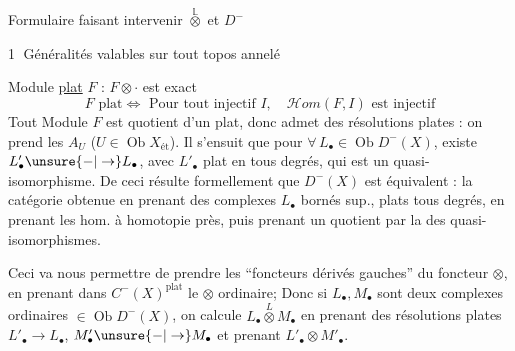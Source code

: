 Formulaire faisant intervenir $\overset{\mathbb L}{\otimes}$ et $D^-$

\textcircled{1} Généralités valables sur tout topos annelé

Module \uline{plat} $F$ : $F\otimes\cdot$ est exact
\[
F\text{ plat}\Longleftrightarrow\text{ Pour tout injectif }I,\quad\mathcal Hom(F,I)\text{ est injectif}
\]
Tout Module $F$  est quotient d'un plat, donc admet des résolutions plates : on prend les $A_U$ ($U\in\operatorname{Ob}X_{\mathrm{ét}}$). Il s'ensuit  que pour $\forall\,L_\bullet\in\operatorname{Ob}D^-(X)$, existe  $L'_\bullet\unsure{-|\to}L_\bullet$, avec $L'_\bullet$ plat en tous degrés, qui est un quasi-isomorphisme.
De ceci résulte formellement que $D^-(X)$ est équivalent : la catégorie obtenue en prenant  des complexes $L_\bullet$ bornés sup., plats  tous degrés,  en prenant les hom. à homotopie près, puis prenant un quotient par la   des quasi-isomorphismes.

Ceci va nous permettre de prendre les ``foncteurs dérivés gauches'' du foncteur $\otimes$, en prenant dans $C^-(X)^{\mathrm{plat}}$ le $\otimes$ ordinaire; 
Donc si $L_\bullet,M_\bullet$ sont deux complexes ordinaires $\in\operatorname{Ob}D^-(X)$, on  calcule $L_\bullet\overset{L}{\otimes}M_\bullet$ en prenant des résolutions plates $L'_\bullet\to L_\bullet$, $M'_\bullet\unsure{-|\to}M_\bullet$ et prenant $L'_\bullet\otimes M'_\bullet$.
